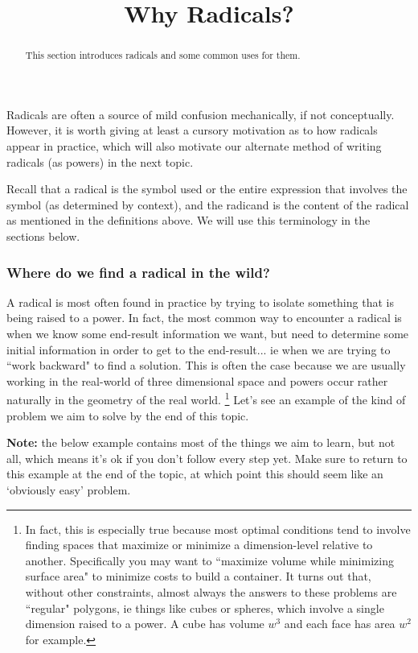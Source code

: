 \documentclass{ximera}
\title{Why Radicals?}
\begin{document}
\begin{abstract}
    This section introduces radicals and some common uses for them.
\end{abstract}
\maketitle
    Radicals are often a source of mild confusion mechanically, if not conceptually. However, it is worth giving at least a cursory motivation as to how radicals appear in practice, which will also motivate our alternate method of writing radicals (as powers) in the next topic.

    Recall that a radical is the symbol used or the entire expression that involves the symbol (as determined by context), and the radicand is the content of the radical as mentioned in the definitions above. We will use this terminology in the sections below.

    \subsubsection*{Where do we find a radical in the wild?}
        A radical is most often found in practice by trying to isolate something that is being raised to a power. In fact, the most common way to encounter a radical is when we know some end-result information we want, but need to determine some initial information in order to get to the end-result... ie when we are trying to ``work backward" to find a solution. This is often the case because we are usually working in the real-world of three dimensional space and powers occur rather naturally in the geometry of the real world.%
        \footnote{In fact, this is especially true because most optimal conditions tend to involve finding spaces that maximize or minimize a dimension-level relative to another. Specifically you may want to ``maximize volume while minimizing surface area" to minimize costs to build a container. It turns out that, without other constraints, almost always the answers to these problems are ``regular" polygons, ie things like cubes or spheres, which involve a single dimension raised to a power. A cube has volume $w^3$ and each face has area $w^2$ for example.}
        Let's see an example of the kind of problem we aim to solve by the end of this topic.

        \textbf{Note:} the below example contains most of the things we aim to learn, but not all, which means it's ok if you don't follow every step yet. Make sure to return to this example at the end of the topic, at which point this should seem like an `obviously easy' problem.
\end{document}
